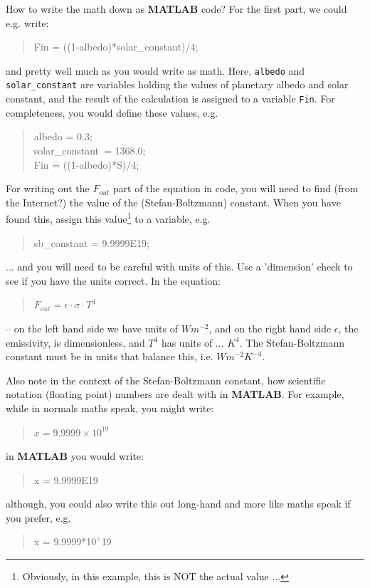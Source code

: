\documentclass{tufte-book} %
\newenvironment{docspec}{\begin{quotation}\ttfamily\parskip0pt\parindent0pt\ignorespaces}{\end{quotation}}
\newenvironment{docspecnormal}{\begin{quotation}\ttfamily\normalsize\parskip0pt\parindent0pt\ignorespaces}{\end{quotation}}
\begin{document}
How to write the math down as \textbf{MATLAB} code? For the first part, we could e.g. write:
\begin{docspec}
Fin = ((1-albedo)*solar\_constant)/4;
\end{docspec}
and pretty well much as you would write as math. Here, \texttt{albedo} and \texttt{solar\_constant} are variables holding the values of planetary albedo and solar constant, and the result of the calculation is assigned to a variable \texttt{Fin}. For completeness, you would define these values, e.g.
\begin{docspec}
albedo = 0.3;\\
solar\_constant\ = 1368.0;\\
Fin = ((1-albedo)*S)/4;
\end{docspec}

For writing out the \(F_{out}\) part of the equation in code, you will need to find (from the Internet?) the value of the (Stefan-Boltzmann) constant. When you have found this, assign this value\footnote{Obviously, in this example, this is NOT the actual value ...} to a variable, e.g.
\begin{docspec}
sb\_constant = 9.9999E19;
\end{docspec}

\noindent ... and you will need to be careful with units of this. Use a 'dimension' check to see if you have the units correct. In the equation:
\begin{docspecnormal}
\(F_{out} = \epsilon \cdot \sigma \cdot T^{4}\)
\end{docspecnormal}
-- on the left hand side we have units of \(W m^{-2}\), and on the right hand side \(\epsilon\), the emissivity, is dimensionless, and \(T^{4}\) has units of ... \(K^{4}\). The Stefan-Boltzmann constant must be in units that balance this, i.e. \(W m^{-2} K^{-4}\).

Also note in the context of the Stefan-Boltzmann constant, how scientific notation (floating point) numbers are dealt with in \textbf{MATLAB}. For example, while in normals maths speak, you might write:
\begin{docspecnormal}
\(x = 9.9999\times 10^{19}\)
\end{docspecnormal}
in \textbf{MATLAB} you would write:
\begin{docspec}
x = 9.9999E19
\end{docspec}
although, you could also write this out long-hand and more like maths speak if you prefer, e.g.
\begin{docspec}
x = 9.9999*10\(^{\wedge}\)19
\end{docspec}
\end{document}
